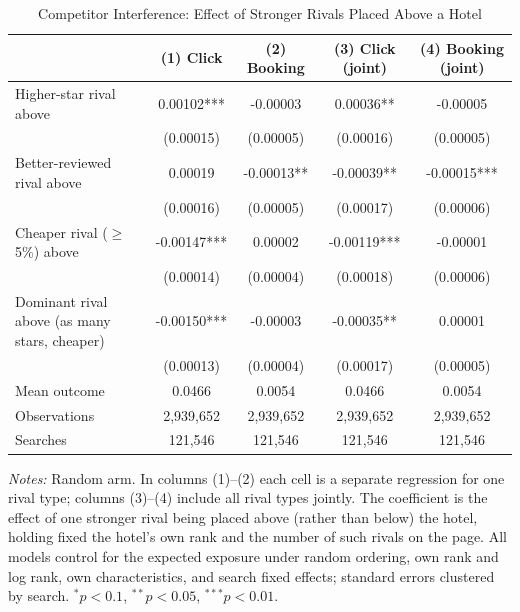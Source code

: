 \begin{table}[htbp]\centering
\caption{Competitor Interference: Effect of Stronger Rivals Placed Above a Hotel}\label{tab:interference}
\begin{tabular}{lcccc}
\toprule
 & (1) Click & (2) Booking & (3) Click (joint) & (4) Booking (joint) \\
\midrule
Higher-star rival above & 0.00102*** & -0.00003 & 0.00036** & -0.00005 \\
 & (0.00015) & (0.00005) & (0.00016) & (0.00005) \\
Better-reviewed rival above & 0.00019 & -0.00013** & -0.00039** & -0.00015*** \\
 & (0.00016) & (0.00005) & (0.00017) & (0.00006) \\
Cheaper rival ($\geq$5\%) above & -0.00147*** & 0.00002 & -0.00119*** & -0.00001 \\
 & (0.00014) & (0.00004) & (0.00018) & (0.00006) \\
Dominant rival above (as many stars, cheaper) & -0.00150*** & -0.00003 & -0.00035** & 0.00001 \\
 & (0.00013) & (0.00004) & (0.00017) & (0.00005) \\
\midrule
Mean outcome & 0.0466 & 0.0054 & 0.0466 & 0.0054 \\
Observations & 2,939,652 & 2,939,652 & 2,939,652 & 2,939,652 \\
Searches & 121,546 & 121,546 & 121,546 & 121,546 \\
\bottomrule
\end{tabular}
\begin{minipage}{0.92\textwidth}\footnotesize
\vspace{0.3em}\textit{Notes:} Random arm. In columns (1)--(2) each cell is a separate regression for one rival type; columns (3)--(4) include all rival types jointly. The coefficient is the effect of one stronger rival being placed above (rather than below) the hotel, holding fixed the hotel's own rank and the number of such rivals on the page. All models control for the expected exposure under random ordering, own rank and log rank, own characteristics, and search fixed effects; standard errors clustered by search. $^{*}p<0.1$, $^{**}p<0.05$, $^{***}p<0.01$.
\end{minipage}
\end{table}
